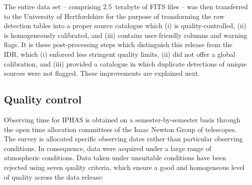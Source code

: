 \documentclass[a4paper,useAMS,usenatbib]{mn2e}
\begin{document}
{The entire data set -- comprising 2.5~terabyte of FITS files --
was then transferred to the University of Hertfordshire
for the purpose of transforming the raw
detection tables into a proper source catalogue which
(i) is quality-controlled,
(ii) is homogeneously calibrated, and 
(iii) contains user-friendly columns and warning flags.
It is these post-processing steps which distinguish this release
from the IDR, which (i) enforced less stringent quality limits,
(ii) did not offer a global calibration,
and (iii) provided a catalogue in which duplicate detections
of unique sources were not flagged.
These improvements are explained next.}


\subsection{Quality control}
\label{sec:qc}

Observing time for IPHAS is obtained
on a semester-by-semester basis
through the open time allocation committees 
of the Isaac Newton Group of telescopes.
The survey is allocated specific observing dates
rather than particular observing conditions.
In consequence, data were acquired
under a large range of atmospheric conditions.
Data taken under unsuitable conditions
have been rejected using seven quality criteria,
which ensure a good and homogeneous level of quality
across the data release:
\end{document}
